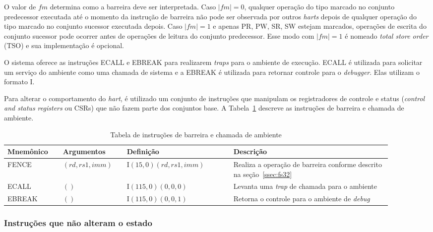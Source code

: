   O valor de $f\!m$ determina como a barreira deve ser interpretada.
  Caso $|f\!m| = 0$, qualquer operação do tipo marcado no conjunto
  predecessor executada até o momento da instrução de barreira não 
  pode ser observada por outros \emph{harts} depois de
  qualquer operação do tipo marcado no conjunto
  sucessor executada depois. Caso $|f\!m| = 1$ e apenas PR, PW, SR, SW
  estejam marcados, operações de escrita do conjunto sucessor
  pode ocorrer antes de operações de leitura do conjunto predecessor.
  Esse modo com $|f\!m| = 1$ é nomeado \emph{total store order} (TSO) e sua implementação é opcional.

  O sistema oferece as instruções ECALL e EBREAK para realizarem \emph{traps} para o ambiente de
  execução. ECALL é utilizada para solicitar um serviço do ambiente como uma chamada de sistema e a
  EBREAK é utilizada para retornar controle para o \emph{debugger}. Elas utilizam o formato I.

  Para alterar o comportamento do \emph{hart}, é utilizado um conjunto de instruções que manipulam os
  registradores de controle e status (\emph{control and status registers} ou CSRs) que não
  fazem parte dos conjuntos base. A Tabela~\ref{tab:sys32} descreve as instruções de barreira e chamada de ambiente.

  \begin{table}
    \begin{tabular}{ |p{0.13\linewidth}||p{0.15\linewidth}|p{0.25\linewidth}|p{0.37\linewidth}| } 
      \hline
      Mnemônico & Argumentos & Definição & Descrição\\ \hline \hline

FENCE & $(rd, rs1, imm)$ & I$(15, 0)(rd, rs1, imm)$ & Realiza a operação de barreira conforme descrito na seção~\ref{ssec:fs32} \\ \hline
ECALL & $()$ & I$(115,0)(0,0,0)$ & Levanta uma \emph{trap} de chamada para o ambiente \\ \hline
EBREAK &  $()$ & I$(115,0)(0,0,1)$ & Retorna o controle para o ambiente de \emph{debug} \\ \hline
    \end{tabular}
  \caption{Tabela de instruções de barreira e chamada de ambiente \label{tab:sys32}}
  \end{table}

\subsubsection{Instruções que não alteram o estado}
\label{ssec:nop32}


